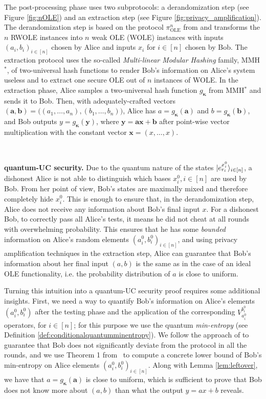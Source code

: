 The post-processing phase uses two subprotocols: a derandomization step (see Figure \ref{fig:nOLE}) and an extraction step (see Figure \ref{fig:privacy_amplification}). The derandomization step is based on the protocol $\pi^n_{\text{OLE}}$ from \cite{DHNO19} and transforms the $n$ RWOLE instances into $n$ weak OLE (WOLE) instances with inputs $(a_i, b_i)_{i\in [n]}$ chosen by Alice and inputs $x_i$ for $i\in [n]$ chosen by Bob. The extraction protocol uses the so-called \textit{Multi-linear Modular Hashing} family, MMH$^*$, of two-universal hash functions \cite{HK97} to render Bob's information on Alice's system useless and to extract one secure OLE out of $n$ instances of WOLE. In the extraction phase, Alice samples a two-universal hash function $g_{\bm{\kappa}}$ from MMH$^*$ and sends it to Bob. Then, with adequately-crafted vectors $(\bm{a}, \bm{b}) = \big( (a_1, \ldots, a_n), (b_1, \ldots, b_n) \big)$, Alice has $a = g_{\bm{\kappa}}(\bm{a})$ and $b = g_{\bm{\kappa}}(\bm{b})$, and Bob outputs $y = g_{\bm{\kappa}}(\bm{y})$, where $\bm{y} = \bm{a} \bm{x} + \bm{b}$ after point-wise vector multiplication with the constant vector $\bm{x} = (x, \ldots, x)$. 



\


\noindent\textbf{quantum-UC security.} %
Due to the quantum nature of the states $| e^{x^0_i}_{r_i} \rangle_{i\in [n]}$, a dishonest Alice is not able to distinguish which bases $x^0_i, i\in [n]$ are used by Bob. From her point of view, Bob's states are maximally mixed and therefore completely hide $x^0_i$. This is enough to ensure that, in the derandomization step, Alice does not receive any information about Bob's final input $x$. For a dishonest Bob, to correctly pass all Alice's tests, it means he did not cheat at all rounds with overwhelming probability. This ensures that he  has some \textit{bounded} information on Alice's random elements $(a^0_i, b^0_i)_{i\in [n]}$, and using privacy amplification techniques in the extraction step, Alice can guarantee that Bob's information about her final input $(a,b)$ is the same as in the case of an ideal OLE functionality, i.e. the probability distribution of $a$ is close to uniform.

Turning this intuition into a quantum-UC security proof requires some additional insights. First, we need a way to quantify Bob's information on Alice's elements $(a^0_i, b^0_i)$ after the testing phase and the application of the corresponding $V^{b^0_i}_{a^0_i}$  operators, for $ i\in [n]$; for this purpose we use the quantum \textit{min-entropy} (see Definition \ref{def:conditionalquantumminentropy}). We follow the approach of \cite{DFLSS09} to guarantee that Bob does not significantly deviate from the protocol in all the rounds, and we use Theorem 1 from~\cite{Dupuis2015} to compute a concrete lower bound of Bob's min-entropy on Alice elements $(a^0_i, b^0_i)_{i\in [n]}$. Along with Lemma \ref{lem:leftover}, we have that $a = g_{\bm{\kappa}}(\bm{a})$ is close to uniform, which is sufficient to prove that Bob does not know more about $(a,b)$ than what the output $y = ax + b$ reveals. 

